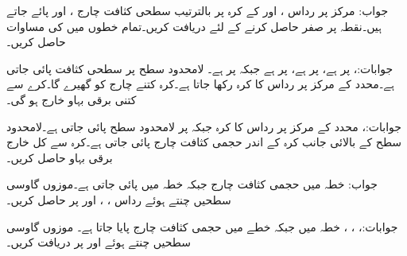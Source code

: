 جواب:
مرکز پر رداس ،  اور  کے کرہ پر بالترتیب سطحی کثافت چارج ، 
 اور  پائے جاتے ہیں۔نقطہ  پر صفر  حاصل کرنے کے لئے  دریافت کریں۔تمام خطوں میں  کی مساوات حاصل کریں۔  

جوابات:،  پر  ہے،  پر  ہے، پر  ہے جبکہ  پر  ہے۔
لامحدود سطح  پر  سطحی کثافت پائی جاتی ہے۔محدد کے مرکز پر  رداس کا کرہ رکھا جاتا ہے۔کرہ کتنے چارج کو گھیرے گا۔کرے سے کتنی برقی بہاو خارج ہو گی۔

جوابات:، 
محدد کے مرکز پر  رداس کا کرہ جبکہ  پر لامحدود سطح پائی جاتی ہے۔لامحدود سطح کے بالائی جانب کرہ کے اندر  حجمی کثافت
 چارج  پائی جاتی ہے۔کرہ سے کل خارج برقی بہاو حاصل کریں۔

جواب: 
خطہ  میں حجمی کثافت چارج  جبکہ
 خطہ  میں  پائی جاتی ہے۔موزوں گاوسی سطحیں چنتے ہوئے رداس ، ،  اور  پر  حاصل کریں۔

جوابات:، ، ، 
خطہ  میں  جبکہ  خطے میں  حجمی کثافت چارج پایا جاتا ہے۔ موزوں گاوسی سطحیں چنتے
 ہوئے   اور  پر  دریافت کریں۔

